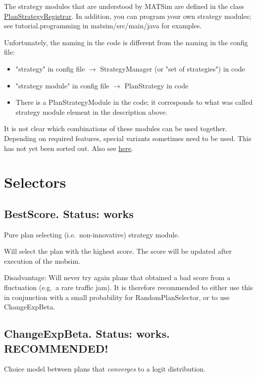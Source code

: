 The strategy modules that are understood by MATSim are defined in the class \href{http://www.matsim.org/xref/org/matsim/core/controler/PlanStrategyRegistrar.html}{PlanStrategyRegistrar}. In addition, you can program your own strategy modules; see tutorial.programming in matsim/src/main/java for examples.

Unfortunately, the naming in the code is different from the naming in the config file:
\begin{itemize}
	\item "strategy" in config file $\rightarrow$ StrategyManager (or "set of strategies") in code
	\item "strategy module" in config file $\rightarrow$ PlanStrategy in code
	\item There is a PlanStrategyModule in the code; it corresponds to what was called strategy module element in the description above.
\end{itemize}

It is not clear which combinations of these modules can be used  together. Depending on required features, special variants sometimes  need to be used. This has not yet been sorted out. Also see \href{http://matsim.org/node/690}{here}.


\vfill\eject
\section{Selectors}
\label{sec:selectors}

\subsection{BestScore.  Status: works}

Pure plan selecting (i.e.\ non-innovative) strategy module.

Will select the plan with the highest score. The score will be updated after execution of the mobsim.

Disadvantage: Will never try again plans that obtained a bad score  from a fluctuation (e.g.\ a rare traffic jam). It is therefore  recommended to either use this in conjunction with a small probability  for RandomPlanSelector, or to use ChangeExpBeta.

\subsection{ChangeExpBeta. Status: works. RECOMMENDED!}

Choice model between plans that \emph{converges} to a logit distribution.

